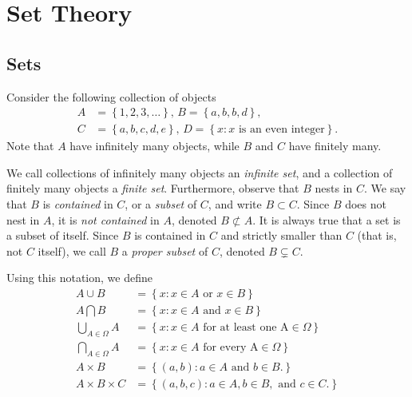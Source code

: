 
\chapter{Set Theory}
\section{Sets}
Consider the following collection of objects
\begin{equation*}
\begin{split}
	A & = \left\{ 1,2,3,\ldots \right\}, \,
	B = \left\{ a, b, b, d \right\}, \,  \\
	C & = \left\{ a,b,c,d,e \right\}, \,
  D = \left\{ x: x \text{ is an even integer} \right\}.
\end{split}
\end{equation*}
Note that $A$ have infinitely many objects, while $B$ and $C$ have finitely
many. 
\begin{definition}
We call collections of infinitely many objects an \emph{infinite set},
and a collection of finitely many objects a \emph{finite set}. 
Furthermore, observe that $B$ nests in $C$. We say that $B$ is
\emph{contained} in $C$, or a \emph{subset} of $C$, and write
$B \subset C$. Since $B$ does not nest in $A$, it is \emph{not contained} in
$A$, denoted $B \not \subset A$. It is always true that a set is a subset of
itself. Since $B$ is
contained in $C$ and strictly smaller
than $C$ (that is, not $C$ itself), we call $B$ a \emph{proper subset} of $C$, denoted $B \subsetneq C$.
\end{definition}
\begin{notation}
Using this notation, we define
\begin{equation*}
\begin{split}
	A \cup B & = \left\{ x: x \in A \text{ or } x \in B \right\} \\
  A \bigcap B & = \left\{ x: x \in A \text{ and } x \in B \right\} \\
	\bigcup_{A \in \Omega} A & = \left\{ x: x \in A \text{ for at least one A} \in \Omega
	\right\} \\
\bigcap_{A \in \Omega} A & = \left\{ x: x \in A \text{ for every A} \in \Omega \right\}
\\
 A \times B & = \left\{ (a,b): a \in A \text{ and } b \in B. \right\}
\\
A \times B \times C & = \left\{ (a,b,c): a \in A, b \in B,  \text{ and } c \in C. \right\}
\end{split}
\end{equation*}
\end{notation}

